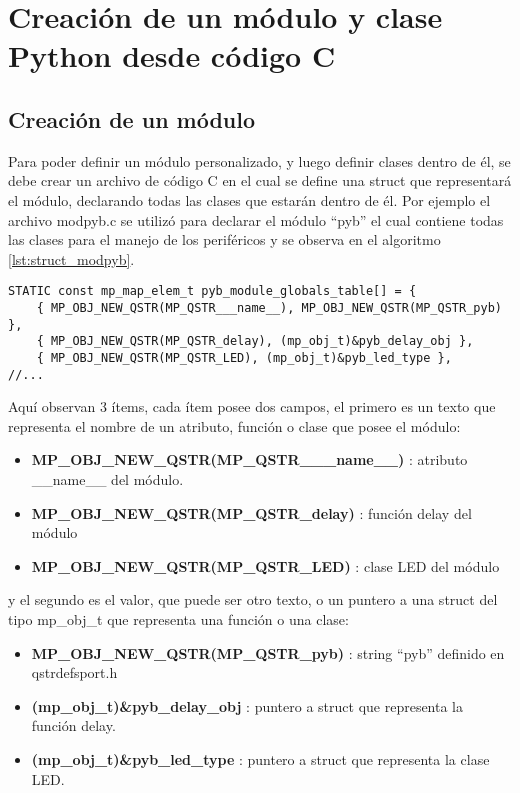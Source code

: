 
\chapter{Creación de un módulo y clase Python desde código C} %

\label{AppendixA} %

\section{Creación de un módulo}

Para poder definir un módulo personalizado, y luego definir clases dentro de él, se debe crear un archivo de código C en el cual se define una struct que representará el módulo, declarando todas las clases que estarán dentro de él. Por ejemplo el archivo modpyb.c se utilizó para declarar el módulo “pyb” el cual contiene todas las clases para el manejo de los periféricos y se observa en el algoritmo \ref{lst:struct_modpyb}.

\begin{lstlisting}[label={lst:struct_modpyb},caption=Estructura donde se definen los atributos\, funciones y clases del módulo.] 
STATIC const mp_map_elem_t pyb_module_globals_table[] = {
    { MP_OBJ_NEW_QSTR(MP_QSTR___name__), MP_OBJ_NEW_QSTR(MP_QSTR_pyb) },
    { MP_OBJ_NEW_QSTR(MP_QSTR_delay), (mp_obj_t)&pyb_delay_obj },
    { MP_OBJ_NEW_QSTR(MP_QSTR_LED), (mp_obj_t)&pyb_led_type },
//...
\end{lstlisting}

Aquí observan 3 ítems, cada ítem posee dos campos, el primero es un texto que representa el nombre de un atributo, función o clase que posee el módulo:
\begin{itemize}
\item \textbf{MP\_OBJ\_NEW\_QSTR(MP\_QSTR\_\_\_name\_\_)} : atributo \_\_name\_\_ del módulo.
\item \textbf{MP\_OBJ\_NEW\_QSTR(MP\_QSTR\_delay)} : función delay del módulo
\item \textbf{MP\_OBJ\_NEW\_QSTR(MP\_QSTR\_LED)} : clase LED del módulo
\end{itemize}

y el segundo es el valor, que puede ser otro texto, o un puntero a una struct del tipo mp\_obj\_t que representa una función o una clase:
\begin{itemize}
\item \textbf{MP\_OBJ\_NEW\_QSTR(MP\_QSTR\_pyb)} : string “pyb” definido en qstrdefsport.h
\item \textbf{(mp\_obj\_t)\&pyb\_delay\_obj} : puntero a struct que representa la función delay.
\item \textbf{(mp\_obj\_t)\&pyb\_led\_type} : puntero a struct que representa la clase LED.
\end{itemize}

